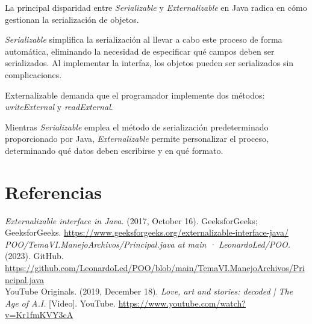\documentclass[12pt]{article}
\begin{document}
\begin{enumerate}
    La principal disparidad entre \textit{Serializable} y \textit{Externalizable} en Java radica en cómo gestionan la serialización de objetos.

    \textit{Serializable} simplifica la serialización al llevar a cabo este proceso de forma automática, eliminando la necesidad de especificar qué campos deben ser serializados. Al implementar la interfaz, los objetos pueden ser serializados sin complicaciones.

    Externalizable demanda que el programador implemente dos métodos: \textit{writeExternal} y \textit{readExternal}.

    Mientras \textit{Serializable} emplea el método de serialización predeterminado proporcionado por Java, \textit{Externalizable} permite personalizar el proceso, determinando qué datos deben escribirse y en qué formato.
  \end{enumerate}

  \section*{Referencias}
  \textit{Externalizable interface in Java.} (2017, October 16). GeeksforGeeks; GeeksforGeeks. \url{https://www.geeksforgeeks.org/externalizable-interface-java/} \\

  \textit{POO/TemaVI.ManejoArchivos/Principal.java at main · LeonardoLed/POO.} (2023). GitHub. \url{https://github.com/LeonardoLed/POO/blob/main/TemaVI.ManejoArchivos/Principal.java} \\

  YouTube Originals. (2019, December 18). \textit{Love, art and stories: decoded | The Age of A.I.} [Video]. YouTube. \url{https://www.youtube.com/watch?v=Kr1fmKVY3cA}
\end{document}
